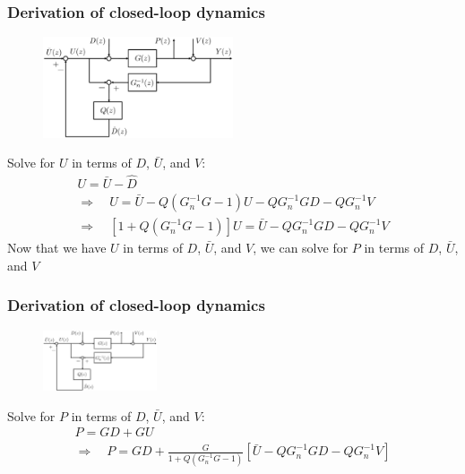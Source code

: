 \begin{frame}
    \frametitle{Derivation of closed-loop dynamics}

    \begin{figure}
        \includegraphics[width=0.5\textwidth]{Disturbance_Observer_DO}\\
    \end{figure}

    Solve for $U$ in terms of $D$, $\bar{U}$, and $V$:
    \begin{gather*}
        U = \bar{U} - \hat{D} \\
        \Rightarrow \quad U = \bar{U} - Q ( G_n^{-1} G - 1) U - Q G_n^{-1} GD - QG_n^{-1} V \\
        \Rightarrow \quad [1 + Q ( G_n^{-1} G - 1)] U = \bar{U} - Q G_n^{-1} GD - QG_n^{-1} V
    \end{gather*}
    \pause
    Now that we have $U$ in terms of $D$, $\bar{U}$, and $V$, we can solve for $P$ in terms of $D$, $\bar{U}$, and $V$
\end{frame}

\begin{frame}
    \frametitle{Derivation of closed-loop dynamics}

    \begin{figure}
        \includegraphics[width=0.3\textwidth]{Disturbance_Observer_DO}\\
    \end{figure}

    Solve for $P$ in terms of $D$, $\bar{U}$, and $V$:
    \begin{gather*}
        P = GD + GU \\
        \Rightarrow \quad P = GD + \frac{G}{1 + Q ( G_n^{-1} G - 1)} 
            [ \bar{U} - Q G_n^{-1} GD - QG_n^{-1} V ]
    \end{gather*}
    \pause
\end{frame}

